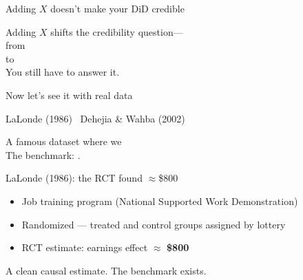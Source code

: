 \documentclass[aspectratio=169,11pt]{beamer}
\begin{document}

\begin{frame}{Adding $X$ doesn't make your DiD credible}
\vspace{1.0em}
\begin{center}
\large
Adding $X$ shifts the credibility question---\\[0.6em]
from \\[0.5em]
to \\[0.8em]
\color{warmgray}\normalsize
You still have to answer it.
\end{center}
\end{frame}

\begin{frame}{Now let's see it with real data}
\vspace{1.2em}
\begin{center}
\Large
LaLonde (1986) \textperiodcentered\ Dehejia \& Wahba (2002)
\end{center}
\vspace{0.8em}
\begin{center}
\color{warmgray}
A famous dataset where we \\[0.4em]
The benchmark: .
\end{center}
\end{frame}

\begin{frame}{LaLonde (1986): the RCT found $\approx$\$800}
\vspace{0.8em}
\begin{itemize}\setlength\itemsep{0.6em}
  \item Job training program (National Supported Work Demonstration)
  \item Randomized --- treated and control groups assigned by lottery
  \item RCT estimate: earnings effect $\approx$ \textbf{\$800}
\end{itemize}
\vspace{0.6em}
\begin{center}\color{warmgray}\small
A clean causal estimate. The benchmark exists.
\end{center}
\end{frame}
\end{document}
